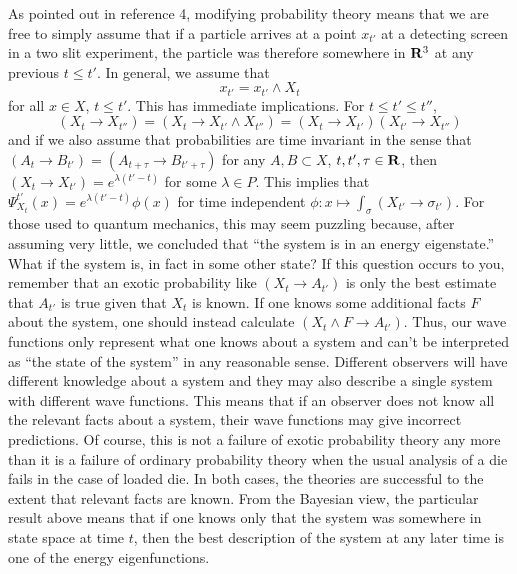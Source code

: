 \documentclass[12pt]{article}
\begin{document}
    As pointed out in reference 4, modifying probability theory means that
we are free to simply assume that if a particle arrives at a point
$x_{t'}$ at a detecting screen in a two slit experiment, the particle was 
therefore somewhere in ${\bf R}^3$ at any previous $t\leq t'$.  In general, we assume that
\begin{equation}
x_{t'} = x_{t'} \wedge X_t
\end{equation}
for all $x\in X$, $t\leq t'$.
This has immediate implications.  For $t\leq t' \leq t''$, 
\begin{equation}
(X_t\rightarrow X_{t''})=(X_t\rightarrow X_{t'}\wedge X_{t''})=(X_t\rightarrow
X_{t'})(X_{t'}\rightarrow X_{t''})
\end{equation}
and if we also assume that probabilities are time invariant in the sense that
$(A_t\rightarrow B_{t'})=(A_{t+\tau}\rightarrow B_{t'+\tau})$ for any $A,B\subset X$,
$t,t',\tau\in {\bf R}$,
then $(X_t\rightarrow X_{t'}) = e^{\lambda (t'-t)}$ for some $\lambda\in P$.
This implies that 
$\Psi^{t'}_{X_t}(x) = e^{\lambda (t'-t)} \phi(x)$ for time independent 
$\phi:x\mapsto \int_\sigma (X_{t'}\rightarrow \sigma_{t'})$.
For those used to quantum mechanics, this may seem puzzling because, after assuming very 
little, we concluded that ``the system is in an energy eigenstate.''  What
if the system is, in fact in some other state?  If this question occurs to you, remember
that an exotic probability like $(X_t\rightarrow A_{t'})$ is only the best 
estimate that $A_{t'}$ is true given that $X_t$ is known.  If one knows some
additional facts $F$ about the system, one should instead calculate $(X_t\wedge F\rightarrow A_{t'})$.
Thus, our wave functions only represent what one knows about a system and can't 
be interpreted as ``the state of the system'' in any reasonable sense.  Different
observers will have different knowledge about a system and they may also describe 
a single system with different wave functions.  This means that if an 
observer does not know all the relevant facts about a system, their wave functions
may give incorrect predictions.  Of course, this is not a failure of exotic probability
theory 
any more than it is a failure of ordinary probability theory when the usual analysis of 
a die fails in the case of loaded die.  In both cases, the theories are successful to
the extent that relevant facts are known.  From the Bayesian view, the particular result 
above means that if one knows only that the system was somewhere in state space 
at time $t$, then the best description of the system at any later time is one of the 
energy eigenfunctions. 
   
\end{document}
